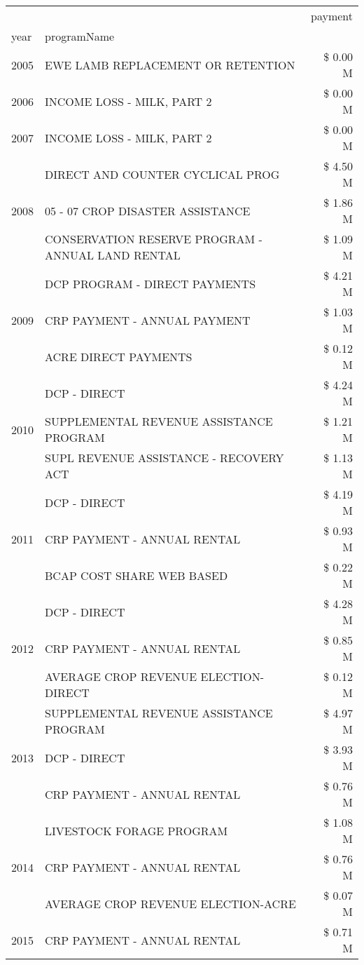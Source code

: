 \begin{tabular}{llr}
\toprule
 &  & payment \\
year & programName &  \\
\midrule
2005 & EWE LAMB REPLACEMENT OR RETENTION & \$ 0.00 M \\
\cline{1-3}
2006 & INCOME LOSS - MILK, PART 2 & \$ 0.00 M \\
\cline{1-3}
2007 & INCOME LOSS - MILK, PART 2 & \$ 0.00 M \\
\cline{1-3}
\multirow[t]{3}{*}{2008} & DIRECT AND COUNTER CYCLICAL PROG & \$ 4.50 M \\
 & 05 - 07 CROP DISASTER ASSISTANCE & \$ 1.86 M \\
 & CONSERVATION RESERVE PROGRAM - ANNUAL LAND RENTAL & \$ 1.09 M \\
\cline{1-3}
\multirow[t]{3}{*}{2009} & DCP PROGRAM - DIRECT PAYMENTS & \$ 4.21 M \\
 & CRP PAYMENT - ANNUAL PAYMENT & \$ 1.03 M \\
 & ACRE DIRECT PAYMENTS & \$ 0.12 M \\
\cline{1-3}
\multirow[t]{3}{*}{2010} & DCP - DIRECT & \$ 4.24 M \\
 & SUPPLEMENTAL REVENUE ASSISTANCE PROGRAM & \$ 1.21 M \\
 & SUPL REVENUE ASSISTANCE - RECOVERY ACT & \$ 1.13 M \\
\cline{1-3}
\multirow[t]{3}{*}{2011} & DCP - DIRECT & \$ 4.19 M \\
 & CRP PAYMENT - ANNUAL RENTAL & \$ 0.93 M \\
 & BCAP COST SHARE WEB BASED & \$ 0.22 M \\
\cline{1-3}
\multirow[t]{3}{*}{2012} & DCP - DIRECT & \$ 4.28 M \\
 & CRP PAYMENT - ANNUAL RENTAL & \$ 0.85 M \\
 & AVERAGE CROP REVENUE ELECTION-DIRECT & \$ 0.12 M \\
\cline{1-3}
\multirow[t]{3}{*}{2013} & SUPPLEMENTAL REVENUE ASSISTANCE PROGRAM & \$ 4.97 M \\
 & DCP - DIRECT & \$ 3.93 M \\
 & CRP PAYMENT - ANNUAL RENTAL & \$ 0.76 M \\
\cline{1-3}
\multirow[t]{3}{*}{2014} & LIVESTOCK FORAGE PROGRAM & \$ 1.08 M \\
 & CRP PAYMENT - ANNUAL RENTAL & \$ 0.76 M \\
 & AVERAGE CROP REVENUE ELECTION-ACRE & \$ 0.07 M \\
\cline{1-3}
\multirow[t]{3}{*}{2015} & CRP PAYMENT - ANNUAL RENTAL & \$ 0.71 M \\

\end{tabular}
